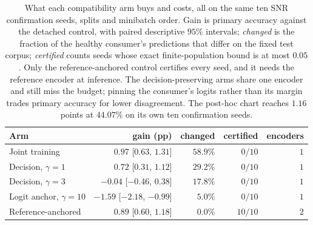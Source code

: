 \begin{table}[t]
\centering
\caption{What each compatibility arm buys and costs, all on the same ten SNR confirmation seeds, splits and minibatch order. Gain is primary accuracy against the detached control, with paired descriptive $95\%$ intervals; \emph{changed} is the fraction of the healthy consumer's predictions that differ on the fixed test corpus; \emph{certified} counts seeds whose exact finite-population bound is at most $0.05$. Only the reference-anchored control certifies every seed, and it needs the reference encoder at inference. The decision-preserving arms share one encoder and still miss the budget; pinning the consumer's logits rather than its margin trades primary accuracy for lower disagreement. The post-hoc chart reaches $1.16$ points at $44.07\%$ on its own ten confirmation seeds.}
\label{tab:compatibility_frontier}
\footnotesize
\setlength{\tabcolsep}{3pt}
\begin{tabular}{lrrrr}
\toprule
Arm & gain (pp) & changed & certified & encoders \\
\midrule
Joint training & $0.97$ [$0.63$, $1.31$] & $58.9\%$ & $0/10$ & $1$ \\
Decision, $\gamma=1$ & $0.72$ [$0.31$, $1.12$] & $29.2\%$ & $0/10$ & $1$ \\
Decision, $\gamma=3$ & $-0.04$ [$-0.46$, $0.38$] & $17.8\%$ & $0/10$ & $1$ \\
Logit anchor, $\gamma=10$ & $-1.59$ [$-2.18$, $-0.99$] & $5.0\%$ & $0/10$ & $1$ \\
Reference-anchored & $0.89$ [$0.60$, $1.18$] & $0.0\%$ & $10/10$ & $2$ \\
\bottomrule
\end{tabular}
\end{table}

